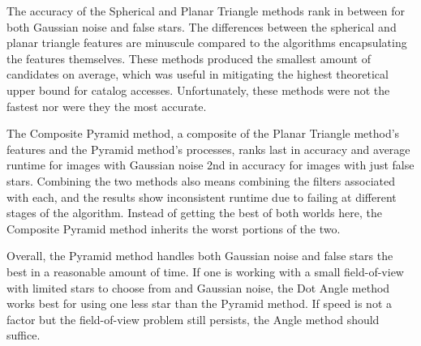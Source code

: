 The accuracy of the Spherical and Planar Triangle methods rank in between for both Gaussian noise and false stars.
The differences between the spherical and planar triangle features are minuscule compared to the algorithms
encapsulating the features themselves.
These methods produced the smallest amount of candidates on average, which was useful in mitigating the highest
theoretical upper bound for catalog accesses.
Unfortunately, these methods were not the fastest nor were they the most accurate.

The Composite Pyramid method, a composite of the Planar Triangle method's features and the Pyramid method's processes,
ranks last in accuracy and average runtime for images with Gaussian noise 2nd in accuracy for images with just
false stars.
Combining the two methods also means combining the filters associated with each, and the results show inconsistent
runtime due to failing at different stages of the algorithm.
Instead of getting the best of both worlds here, the Composite Pyramid method inherits the worst portions of the two.

Overall, the Pyramid method handles both Gaussian noise and false stars the best in a reasonable amount of time.
If one is working with a small field-of-view with limited stars to choose from and Gaussian noise, the Dot Angle
method works best for using one less star than the Pyramid method.
If speed is not a factor but the field-of-view problem still persists, the Angle method should suffice.